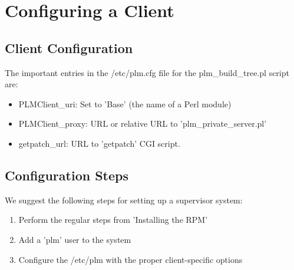 \section {Configuring a Client}

\subsection{Client Configuration}
The important entries in the /etc/plm.cfg file for the plm\_build\_tree.pl script are:

\begin{itemize}
\item PLMClient\_uri: Set to 'Base' (the name of a Perl module)
\item PLMClient\_proxy: URL or relative URL to 'plm\_private\_server.pl'
\item getpatch\_url: URL to 'getpatch' CGI script.
\end{itemize}

\subsection{Configuration Steps}
We suggest the following steps for setting up a supervisor system:
\begin{enumerate}
\item Perform the regular steps from 'Installing the RPM'
\item Add a 'plm' user to the system
\item Configure the /etc/plm with the proper client-specific options
\end{enumerate}
